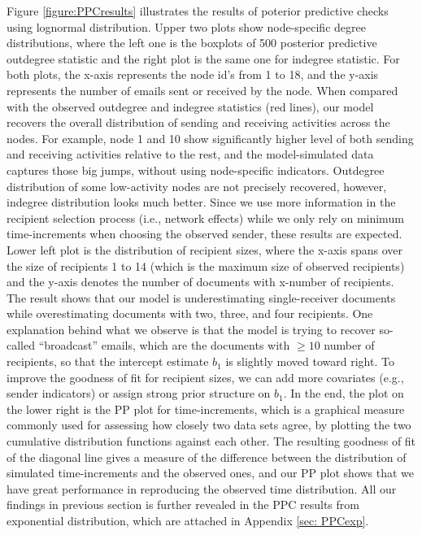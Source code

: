 \documentclass[12pt]{article}
\begin{document}
	Figure \ref{figure:PPCresults} illustrates the results of poterior predictive checks using lognormal distribution. Upper two plots show node-specific degree distributions, where the left one is the boxplots of 500 posterior predictive outdegree statistic and the right plot is the same one for indegree statistic. For both plots, the x-axis represents the node id's from 1 to 18, and the y-axis represents the number of emails sent or received by the node. When compared with the observed outdegree and indegree statistics (red lines), our model recovers the overall distribution of sending and receiving activities across the nodes. For example, node 1 and 10 show significantly higher level of both sending and receiving activities relative to the rest, and the model-simulated data captures those big jumps, without using node-specific indicators. Outdegree distribution of some low-activity nodes are not precisely recovered, however, indegree distribution looks much better. Since we use more information in the recipient selection process (i.e., network effects) while we only rely on minimum time-increments when choosing the observed sender, these results are expected. Lower left plot is the distribution of recipient sizes, where the x-axis spans over the size of recipients 1 to 14 (which is the maximum size of observed recipients) and the y-axis denotes the number of documents with x-number of recipients. The result shows that our model is underestimating single-receiver documents while overestimating documents with two, three, and four recipients. One explanation behind what we observe is that the model is trying to recover so-called ``broadcast'' emails, which are the documents with $\geq 10$ number of recipients, so that the intercept estimate $b_1$ is slightly moved toward right. To improve the goodness of fit for recipient sizes, we can add more covariates (e.g., sender indicators) or assign strong prior structure on $b_1$. In the end, the plot on the lower right is the PP plot for time-increments, which is a graphical measure commonly used for assessing how closely two data sets agree, by plotting the two cumulative distribution functions against each other. The resulting goodness of fit of the diagonal line gives a measure of the difference between the distribution of simulated time-increments and the observed ones, and our PP plot shows that we have great performance in reproducing the observed time distribution. All our findings in previous section is further revealed in the PPC results from exponential distribution, which are attached in Appendix \ref{sec: PPCexp}.
\end{document}

